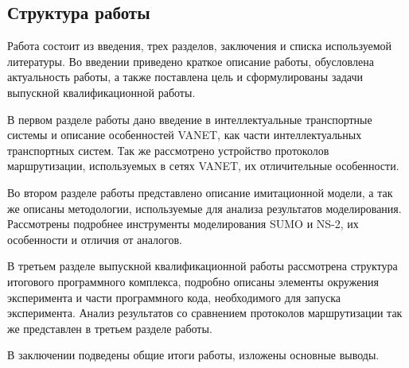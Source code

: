\subsection*{Структура работы}

Работа состоит из введения, трех разделов, заключения и списка используемой литературы. Во введении приведено краткое описание работы, обусловлена актуальность
работы, а также поставлена цель и сформулированы задачи выпускной квалификационной работы.

В первом разделе работы дано введение в интеллектуальные транспортные системы и описание особенностей VANET, как части интеллектуальных транспортных систем. Так же рассмотрено устройство протоколов маршрутизации, используемых в сетях VANET, их отличительные особенности.

Во втором разделе работы представлено описание имитационной модели, а так же описаны методологии, используемые для анализа результатов моделирования. Рассмотрены подробнее инструменты моделирования SUMO и NS-2, их особенности и отличия от аналогов.

В третьем разделе выпускной квалификационной работы рассмотрена структура итогового программного комплекса, подробно описаны элементы окружения эксперимента и части программного кода, необходимого для запуска эксперимента. Анализ результатов со сравнением протоколов маршрутизации так же представлен в третьем разделе работы.

В заключении подведены общие итоги работы, изложены основные выводы.

